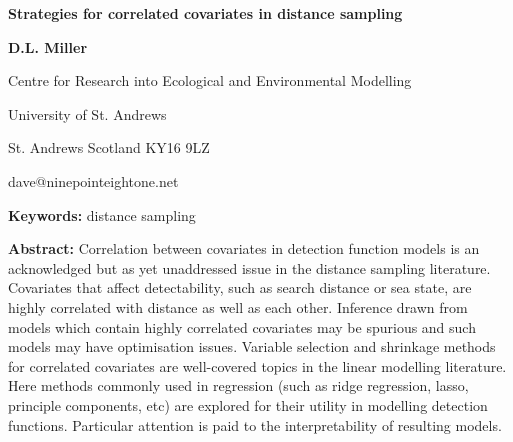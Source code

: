 \documentclass[12pt]{article}
\begin{document}
\centerline{\bf Strategies for correlated covariates in distance sampling}

\vspace{12pt}

\centerline{{\bf D.L. Miller}}

\vspace{12pt}

\centerline{Centre for Research into Ecological and Environmental Modelling}
\centerline{University of St. Andrews}
\centerline{St. Andrews Scotland KY16 9LZ}
\centerline{dave@ninepointeightone.net}

\vspace{24pt}

{\bf Keywords:} distance sampling

\vspace{24pt}

{\bf Abstract:} Correlation between covariates in detection function models is an acknowledged but as yet unaddressed issue in the distance sampling literature. Covariates that affect detectability, such as search distance or sea state, are highly correlated with distance as well as each other. Inference drawn from models which contain highly correlated covariates may be spurious and such models may have optimisation issues. Variable selection and shrinkage methods for correlated covariates are well-covered topics in the linear modelling literature. Here methods commonly used in regression (such as ridge regression, lasso, principle components, etc) are explored for their utility in modelling detection functions. Particular attention is paid to the interpretability of resulting models.


\vspace{12pt}

\vspace{12pt}
\end{document}
